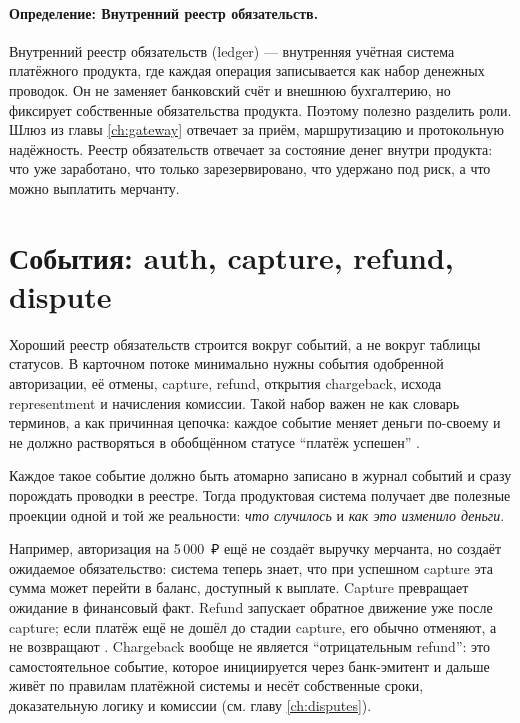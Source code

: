 \paragraph{Определение: Внутренний реестр обязательств.}
Внутренний реестр обязательств (ledger) --- внутренняя учётная система платёжного продукта, где каждая операция записывается как набор денежных проводок. Он не заменяет банковский счёт и внешнюю бухгалтерию, но фиксирует собственные обязательства продукта.
Поэтому полезно разделить роли. Шлюз из главы \ref{ch:gateway}
отвечает за приём, маршрутизацию и протокольную надёжность.
Реестр обязательств отвечает за состояние денег внутри продукта: что уже
заработано, что только зарезервировано, что удержано под риск,
а что можно выплатить мерчанту.

\section{События: auth, capture, refund, dispute}
\label{sec:ledger-events}

Хороший реестр обязательств строится вокруг событий, а не вокруг
таблицы статусов. В карточном потоке минимально нужны события
одобренной авторизации, её отмены, capture, refund, открытия
chargeback, исхода representment и начисления комиссии. Такой
набор важен не как словарь терминов, а как причинная цепочка:
каждое событие меняет деньги по-своему и не должно растворяться
в обобщённом статусе \enquote{платёж успешен}
\cite{mc-tpr,mc-chargeback-guide,adyen-glossary}.

Каждое такое событие должно быть атомарно записано в журнал событий
и сразу порождать проводки в реестре. Тогда продуктовая система
получает две полезные проекции одной и той же реальности:
\textit{что случилось} и \textit{как это изменило деньги}.

Например, авторизация на 5\,000~₽ ещё не создаёт выручку мерчанта,
но создаёт ожидаемое обязательство: система теперь знает, что при
успешном capture эта сумма может перейти в баланс, доступный
к выплате. Capture превращает ожидание в финансовый факт.
Refund запускает обратное движение уже после capture; если платёж ещё
не дошёл до стадии capture, его обычно отменяют, а не возвращают
\cite{adyen-glossary,stripe-manual-capture}. Chargeback вообще не является
\enquote{отрицательным refund}: это самостоятельное событие,
которое инициируется через банк-эмитент и дальше живёт по правилам платёжной системы
и несёт собственные сроки, доказательную логику и комиссии
(см. главу \ref{ch:disputes})\cite{adyen-glossary,mc-chargeback-guide}.

